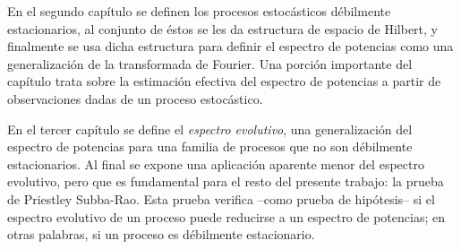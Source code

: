 

En el segundo capítulo se definen los procesos estocásticos débilmente estacionarios, al conjunto de éstos se les da estructura de espacio de Hilbert, y finalmente se usa dicha estructura para definir el espectro de potencias como una generalización de la transformada de Fourier.
%
Una porción importante del capítulo trata sobre la estimación efectiva del espectro de potencias a partir de observaciones dadas de un proceso estocástico.


En el tercer capítulo se define el \textit{espectro evolutivo}, una generalización del espectro de potencias para una familia de procesos que no son débilmente estacionarios.
%
%
Al final se expone una aplicación aparente menor del espectro evolutivo, pero que es fundamental para el resto del presente trabajo: la prueba de Priestley Subba-Rao. 
%
Esta prueba verifica --como prueba de hipótesis-- si el espectro evolutivo de un proceso puede reducirse a un espectro de potencias; en otras palabras, si un proceso es débilmente estacionario.


%

